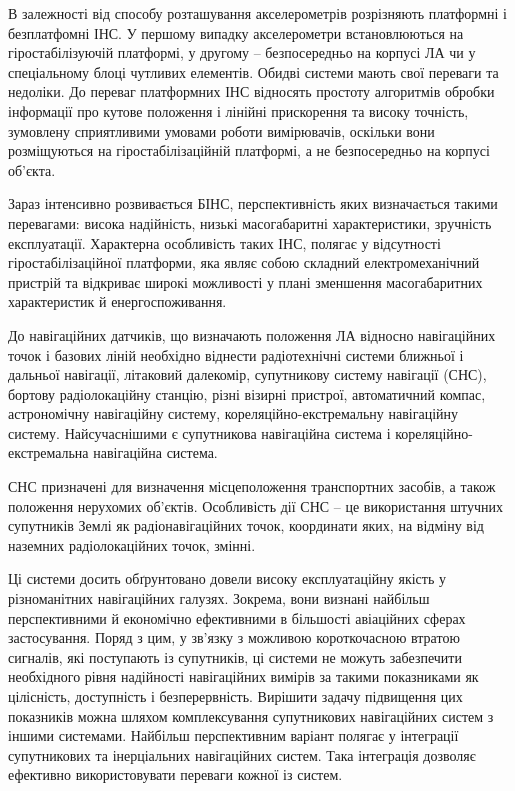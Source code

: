 В залежності від способу розташування акселерометрів  розрізняють платформні і 
безплатфомні ІНС. У першому випадку акселерометри  встановлюються на 
гіростабілізуючій платформі, у другому – безпосередньо на корпусі ЛА чи у 
спеціальному блоці чутливих елементів. Обидві системи мають свої переваги 
та недоліки. До переваг платформних ІНС відносять простоту алгоритмів обробки 
інформації про кутове положення і лінійні прискорення та високу точність, 
зумовлену сприятливими умовами роботи вимірювачів, оскільки вони розміщуються 
на гіростабілізаційній платформі, а не безпосередньо на корпусі об’єкта.

Зараз інтенсивно розвивається БІНС, перспективність яких визначається 
такими перевагами: висока надійність, низькі масогабаритні характеристики, 
зручність експлуатації. Характерна особливість таких ІНС, полягає у 
відсутності гіростабілізаційної платформи, яка являє собою складний 
електромеханічний пристрій та відкриває широкі можливості у плані 
зменшення масогабаритних характеристик й енергоспоживання.

До навігаційних датчиків, що визначають положення ЛА відносно навігаційних 
точок і базових ліній необхідно віднести радіотехнічні системи ближньої і 
дальньої навігації, літаковий далекомір, супутникову систему навігації (СНС), 
бортову радіолокаційну станцію, різні візирні пристрої, автоматичний компас, 
астрономічну навігаційну систему, кореляційно-екстремальну навігаційну систему. 
Найсучаснішими є супутникова навігаційна система і кореляційно-екстремальна 
навігаційна система.

СНС призначені для визначення місцеположення транспортних засобів, а також 
положення нерухомих об’єктів. Особливість дії СНС – це використання штучних 
супутників Землі як радіонавігаційних точок, координати яких, на відміну від 
наземних радіолокаційних точок, змінні. 

Ці системи досить обґрунтовано довели високу експлуатаційну якість у 
різноманітних навігаційних галузях. Зокрема, вони визнані найбільш 
перспективними й економічно ефективними в більшості авіаційних сферах 
застосування. Поряд з цим, у зв’язку з можливою короткочасною втратою 
сигналів, які поступають із супутників, ці системи не можуть забезпечити 
необхідного рівня надійності навігаційних вимірів за такими показниками 
як цілісність, доступність і безперервність. Вирішити задачу підвищення 
цих показників можна шляхом комплексування супутникових навігаційних систем 
з іншими системами. Найбільш перспективним варіант полягає у інтеграції 
супутникових та інерціальних навігаційних систем. Така інтеграція дозволяє 
ефективно використовувати переваги кожної із систем. 

